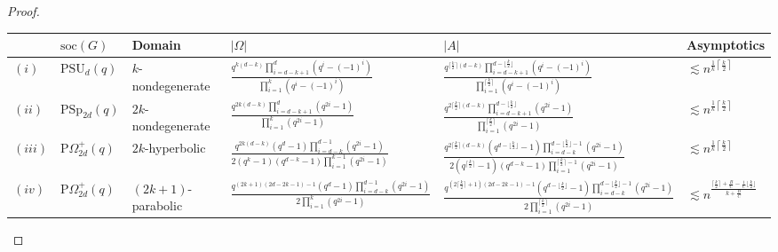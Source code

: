 \documentclass[a4paper]{amsart}
\theoremstyle{definition}
\begin{document}
\begin{proof}
{\small
    \begin{table}
	\centering
	\centering
	\begin{tabularx}{\textwidth}{l l l X X l}
		\toprule
        & $\mathrm{soc}(G)$ & Domain & $|\Omega|$ &  $|A|$ & Asymptotics \\
		
		\midrule
        $(i)$ & $\mathrm{PSU}_d(q)$ & $k$-nondegenerate & $\displaystyle \frac{q^{k(d-k)} \prod \limits_{i=d-k+1}^d(q^i - (-1)^i)}{\prod \limits_{i = 1}^{k}(q^i - (-1)^i)}$ & $\displaystyle \frac{q^{\lceil \frac{k}{2}\rceil (d-k)} \prod \limits_{i=d-k+1}^{d - \lfloor \frac{k}{2}\rfloor}(q^i - (-1)^i)}{\prod \limits_{i = 1}^{\lceil\frac{k}{2}\rceil}(q^i - (-1)^i)}$ & $\displaystyle \lesssim n^{\frac{1}{k} \left\lceil \frac{k}{2}\right\rceil}$ \\
        
        $(ii)$ & $\mathrm{PSp}_{2d}(q)$ & $2k$-nondegenerate & $\displaystyle \frac{q^{2k(d-k)} \prod \limits_{i=d-k+1}^d(q^{2i} - 1)}{\prod \limits_{i = 1}^{k}(q^{2i} - 1)}$ & $\displaystyle \frac{q^{2\lceil \frac{k}{2}\rceil (d-k)} \prod \limits_{i=d-k+1}^{d - \lfloor \frac{k}{2}\rfloor}(q^{2i} - 1)}{\prod \limits_{i = 1}^{\lceil\frac{k}{2}\rceil}(q^{2i} - 1)}$ & $\displaystyle \lesssim n^{\frac{1}{k} \left\lceil \frac{k}{2}\right\rceil}$ \\
        
        $(iii)$ & $\mathrm{P}\Omega_{2d}^+(q)$ & $2k$-hyperbolic & $\displaystyle \frac{q^{2k(d-k)}(q^d - 1)\prod \limits_{i=d-k}^{d-1}(q^{2i} - 1)}{2(q^k -1)(q^{d-k}-1)\prod \limits_{i = 1}^{k-1}(q^{2i} - 1)}$ & $\displaystyle \frac{q^{2\lceil \frac{k}{2}\rceil (d-k)}(q^{d - \lfloor \frac{k}{2}\rfloor} - 1)\prod \limits_{i=d-k}^{d - \lfloor \frac{k}{2}\rfloor -1}(q^{2i} - 1)}{2(q^{\lceil\frac{k}{2}\rceil} -1)(q^{d-k}-1)\prod \limits_{i = 1}^{\lceil\frac{k}{2}\rceil-1}(q^{2i} - 1)}$ & $\displaystyle \lesssim n^{\frac{1}{k} \left\lceil \frac{k}{2}\right\rceil}$\\
        
        $(iv)$ & $\mathrm{P}\Omega_{2d}^+(q)$ &  $(2k+1)$-parabolic & $\displaystyle \frac{q^{(2k+1)(2d -2k -1) -1}(q^d - 1)\prod \limits_{i=d-k}^{d-1}(q^{2i} - 1)}{2\prod \limits_{i = 1}^{k}(q^{2i} - 1)}$ & $\displaystyle \frac{q^{(2\lceil\frac{k}{2}\rceil+1)(2d -2k -1) -1}(q^{d - \lfloor \frac{k}{2}\rfloor} - 1)\prod \limits_{i=d-k}^{d - \lfloor \frac{k}{2}\rfloor -1}(q^{2i} - 1)}{2\prod \limits_{i = 1}^{\lceil\frac{k}{2}\rceil}(q^{2i} - 1)}$ & $\displaystyle \lesssim n^{\frac{\lceil \frac{k}{2}\rceil + \frac{B}{C} - \frac{1}{C}\lfloor \frac{k}{2}\rfloor}{k + \frac{B}{C}}}$ \\
        

\end{tabularx}
\end{table}}
\end{proof}
\end{document}
